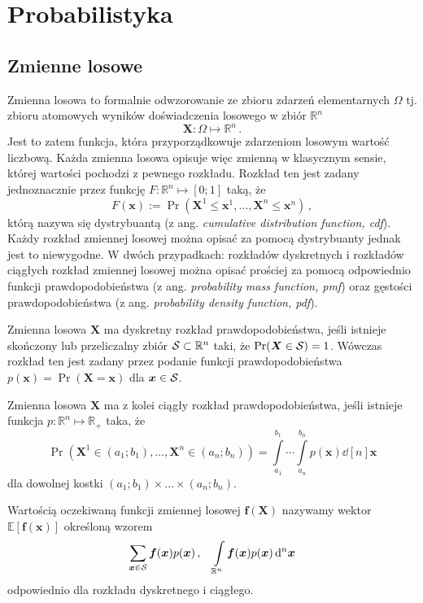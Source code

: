 \documentclass{myclass}
\numberwithin{equation}{subsection}
\begin{document}
\section{Probabilistyka}

\subsection{Zmienne losowe}

Zmienna losowa to formalnie odwzorowanie ze zbioru zdarzeń elementarnych \(\Omega\) tj. zbioru
atomowych wyników doświadczenia losowego w zbiór \(\mathbb{R}^n\)
\[
\bm{X} : \Omega \mapsto \mathbb{R}^n\,.
\]
Jest to zatem funkcja, która przyporządkowuje zdarzeniom losowym wartość liczbową. Każda zmienna
losowa opisuje więc zmienną w klasycznym sensie, której wartości pochodzi z pewnego rozkładu.
Rozkład ten jest zadany jednoznacznie przez funkcję \(F: \mathbb{R}^n \mapsto [0;1]\) taką, że
\[
F(\bm{x}) := \Pr(\bm{X}^1 \leq \bm{x}^1, \ldots, \bm{X}^n \leq \bm{x}^n)\,,
\]
którą nazywa się dystrybuantą (z ang. \textit{cumulative distribution function, cdf}). Każdy rozkład
zmiennej losowej można opisać za pomocą dystrybuanty jednak jest to niewygodne. W dwóch przypadkach:
rozkładów dyskretnych i rozkładów ciągłych rozkład zmiennej losowej można opisać prościej za pomocą
odpowiednio funkcji prawdopodobieństwa (z ang. \textit{probability mass function, pmf}) oraz
gęstości prawdopodobieństwa (z ang. \textit{probability density function, pdf}).

\begin{definition}
Zmienna losowa \(\bm{X}\) ma dyskretny rozkład prawdopodobieństwa, jeśli istnieje skończony lub
przeliczalny zbiór \(\mathcal{S} \subset \mathbb{R}^n\) taki, że \(\Pr(\bm{X} \in \mathcal{S}) = 1\). Wówczas
rozkład ten jest zadany przez podanie funkcji prawdopodobieństwa \(p(\bm{x}) = \Pr(\bm{X} =
\bm{x})\) dla \(\bm{x} \in \mathcal{S}\).
\end{definition}

\begin{definition}
Zmienna losowa \(\bm{X}\) ma z kolei ciągły rozkład prawdopodobieństwa, jeśli istnieje funkcja \(p:
\mathbb{R}^n \mapsto \mathbb{R}_+\) taka, że
\[
\Pr(\bm{X}^1 \in (a_1;b_1), \ldots, \bm{X}^n \in (a_n;b_n)) = \int\limits_{a_1}^{b_1}\cdots\int\limits_{a_n}^{b_n} p(\bm{x}) \dd[n]{\bm{x}}
\]
dla dowolnej kostki \((a_1;b_1)\times\ldots\times(a_n;b_n)\).
\end{definition}

\begin{definition}
Wartością oczekiwaną funkcji zmiennej losowej \(\bm{f}(\bm{X})\) nazywamy wektor
\(\mathbb{E}[\bm{f}(\bm{x})]\) określoną wzorem
\[
 \sum_{\bm{x} \in \mathcal{S}} \bm{f}(\bm{x}) p(\bm{x})\,,\quad \int\limits_{\mathbb{R}^n} \bm{f}(\bm{x}) p(\bm{x}) \dd[n]{\bm{x}}
\]
odpowiednio dla rozkładu dyskretnego i ciągłego.
\end{definition}
\end{document}
